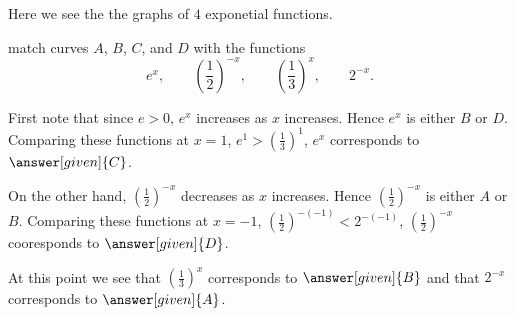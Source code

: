 \documentclass{ximera}
\begin{document}
\begin{example}
  Here we see the the graphs of $4$ exponetial functions.
  \begin{image}
  \end{image}
  match curves $A$, $B$, $C$, and $D$ with the functions
  \[
  e^x, \qquad \left(\frac{1}{2}\right)^{-x}, \qquad  \left(\frac{1}{3}\right)^{x}, \qquad 2^{-x}.
  \]
  \begin{explanation}
    First note that since $e> 0$, $e^x$ increases as $x$
    increases. Hence $e^x$ is either $B$ or $D$. Comparing these
    functions at $x=1$, $e^1> \left(\frac{1}{3}\right)^1$, $e^x$
    corresponds to $\answer[given]{C}$.

    On the other hand, $\left(\frac{1}{2}\right)^{-x}$ decreases as
    $x$ increases. Hence $\left(\frac{1}{2}\right)^{-x}$ is either $A$
    or $B$. Comparing these functions at $x=-1$,
    $\left(\frac{1}{2}\right)^{-(-1)}< 2^{-(-1)}$,
    $\left(\frac{1}{2}\right)^{-x}$ cooresponds to
    $\answer[given]{D}$.

    At this point we see that $\left(\frac{1}{3}\right)^{x}$
    corresponds to $\answer[given]{B}$ and that $2^{-x}$ corresponds
    to $\answer[given]{A}$.
  \end{explanation}
\end{example}
\end{document}
